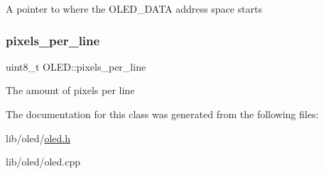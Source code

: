 A pointer to where the O\+L\+E\+D\+\_\+\+D\+A\+TA address space starts \hypertarget{class_o_l_e_d_a6ddac7b826eccac8c682c5246ef52b29}{}\label{class_o_l_e_d_a6ddac7b826eccac8c682c5246ef52b29} 
\subsubsection{\texorpdfstring{pixels\+\_\+per\+\_\+line}{pixels\_per\_line}}
{\footnotesize\ttfamily uint8\+\_\+t O\+L\+E\+D\+::pixels\+\_\+per\+\_\+line\hspace{0.3cm}{\ttfamily [private]}}

The amount of pixels per line 

The documentation for this class was generated from the following files\+:\begin{DoxyCompactItemize}
\item 
lib/oled/\hyperlink{oled_8h}{oled.\+h}\item 
lib/oled/oled.\+cpp\end{DoxyCompactItemize}
